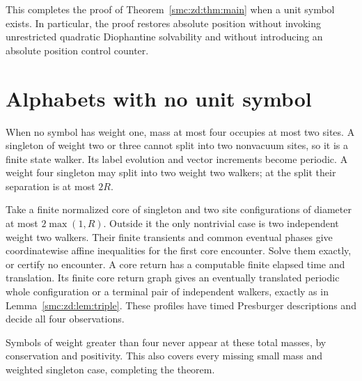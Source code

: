 \documentclass[11pt,letterpaper]{article}
\numberwithin{equation}{section}
\theoremstyle{definition}
\theoremstyle{remark}
\begin{document}
This completes the proof of Theorem~\ref{smc:zd:thm:main} when a unit symbol exists. In particular, the proof restores absolute position without invoking unrestricted quadratic Diophantine solvability and without introducing an absolute position control counter.

\section{Alphabets with no unit symbol}\label{smc:zd:sec:nounit}
When no symbol has weight one, mass at most four occupies at most two sites. A singleton of weight two or three cannot split into two nonvacuum sites, so it is a finite state walker. Its label evolution and vector increments become periodic. A weight four singleton may split into two weight two walkers; at the split their separation is at most $2R$.

Take a finite normalized core of singleton and two site configurations of diameter at most $2\max(1,R)$. Outside it the only nontrivial case is two independent weight two walkers. Their finite transients and common eventual phases give coordinatewise affine inequalities for the first core encounter. Solve them exactly, or certify no encounter. A core return has a computable finite elapsed time and translation. Its finite core return graph gives an eventually translated periodic whole configuration or a terminal pair of independent walkers, exactly as in Lemma~\ref{smc:zd:lem:triple}. These profiles have timed Presburger descriptions and decide all four observations.

Symbols of weight greater than four never appear at these total masses, by conservation and positivity. This also covers every missing small mass and weighted singleton case, completing the theorem.
\end{document}
